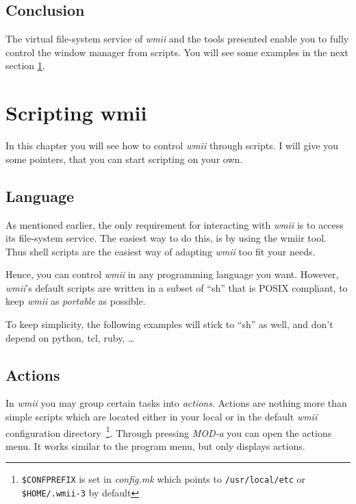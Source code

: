\documentclass[12pt,a4paper]{article} %
\newcommand{\wmii}{\emph{wmii}}
\begin{document}
    \subsection{Conclusion}

    The virtual file-system service of \wmii{} and the tools presented enable
    you to fully control the window manager from scripts.
    You will see some examples in the next section
    \ref{sec:scripting}.

    \section{Scripting wmii}
    \label{sec:scripting}

    In this chapter you will see how to control \wmii{} through scripts. I will
    give you some pointers, that you can start scripting on your own.

    \subsection{Language}

    As mentioned earlier, the only requirement for interacting with \wmii{} is to
    access its file-system service. The easiest way to do this, is by using
    the wmiir tool. Thus shell scripts are the easiest way of adapting \wmii
    too fit your needs.

    Hence, you can control \wmii{} in any programming language you want. However,
    \wmii's default scripts are written in a subset of ``sh'' that is POSIX
    compliant, to keep \wmii{} as \emph{portable} as possible.
    
    To keep simplicity, the following examples will stick to ``sh'' as well,
    and don't depend on python, tcl, ruby, \dots 


    \subsection{Actions}

    In \wmii{} you may group certain tasks into \emph{actions}. Actions
    are nothing more than simple scripts which are located either in
    your local or in the default \wmii{} configuration
    directory~\footnote{ \texttt{\$CONFPREFIX} is set in
      \emph{config.mk} which points to \texttt{/usr/local/etc}
      or \texttt{\$HOME/.wmii-3} by default}.
    Through pressing \emph{MOD-a} you can open the actions menu. It works
    similar to the program menu, but only displays actions.
\end{document}
